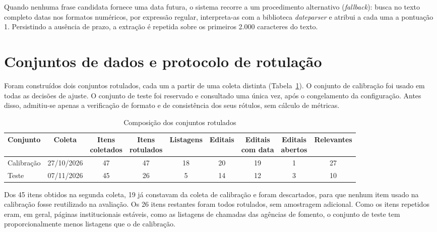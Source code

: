 Quando nenhuma frase candidata fornece uma data futura, o sistema recorre a um
procedimento alternativo (\textit{fallback}): busca no texto completo datas nos
formatos numéricos, por expressão regular, interpreta-as com a biblioteca
\textit{dateparser} e atribui a cada uma a pontuação 1. Persistindo a ausência de prazo,
a extração é repetida sobre os primeiros 2.000 caracteres do texto.

\section{Conjuntos de dados e protocolo de rotulação}
\label{sec:dados}

Foram construídos dois conjuntos rotulados, cada um a partir de uma coleta
distinta (Tabela~\ref{tab:conjuntos}). O conjunto de calibração foi usado em
todas as decisões de ajuste. O conjunto de teste foi reservado e consultado uma
única vez, após o congelamento da configuração. Antes disso, admitiu-se apenas
a verificação de formato e de consistência dos seus rótulos, sem cálculo de
métricas.

\begin{table}[htbp]
\centering
\caption{Composição dos conjuntos rotulados}
\label{tab:conjuntos}
\small
\setlength{\tabcolsep}{4pt}
\begin{tabular}{l c c c c c c c c}
\toprule
Conjunto & Coleta & \makecell{Itens\\coletados} & \makecell{Itens\\rotulados}
  & Listagens & Editais & \makecell{Editais\\com data} & \makecell{Editais\\abertos}
  & Relevantes \\
\midrule
Calibração & 27/10/2026 & 47 & 47 & 18 & 20 & 19 & 1 & 27 \\
Teste      & 07/11/2026 & 45 & 26 &  5 & 14 & 12 & 3 & 10 \\
\bottomrule
\end{tabular}
\end{table}

Dos 45 itens obtidos na segunda coleta, 19 já constavam da coleta de
calibração e foram descartados, para que nenhum item usado na calibração fosse
reutilizado na avaliação. Os 26 itens restantes foram todos rotulados, sem
amostragem adicional. Como os itens repetidos eram, em geral, páginas
institucionais estáveis, como as listagens de chamadas das agências de
fomento, o conjunto de teste tem proporcionalmente menos listagens que o de
calibração.

